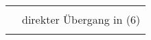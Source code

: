 \begin{tabular}{p{1.6cm}l}
	                &                                                               \\
	                & direkter Übergang in (6)                                      \\
	                &                                                               \\
\end{tabular}
